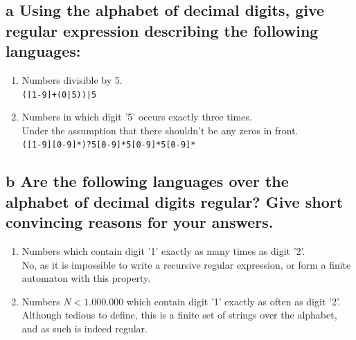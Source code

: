 \documentclass[11pt,a4paper]{article}
\begin{document}
\subsection*{a \mdseries Using the alphabet of decimal digits, give regular
expression describing the following languages:}
\begin{enumerate}[i]
	\item Numbers divisible by 5.\\
	\verb/([1-9]+(0|5))|5/
	\item Numbers in which digit '5' occurs exactly three times.\\
	Under the assumption that there shouldn't be any zeros in front.\\
	\verb/([1-9][0-9]*)?5[0-9]*5[0-9]*5[0-9]*/
\end{enumerate}

\subsection*{b \mdseries Are the following languages over the alphabet of
decimal digits regular? Give short convincing reasons for your answers.}
\begin{enumerate}[i]
	\item Numbers which contain digit '1' exactly as many times as digit '2'.\\
	No, as it is impossible to write a recursive regular expression, or form a
	finite automaton with this property.
	\item Numbers $N < 1.000.000$ which contain digit '1' exactly as often as
	digit '2'.\\
	Although tedious to define, this is a finite set of strings over the
	alphabet, and as such is indeed regular.
\end{enumerate}
\end{document}
